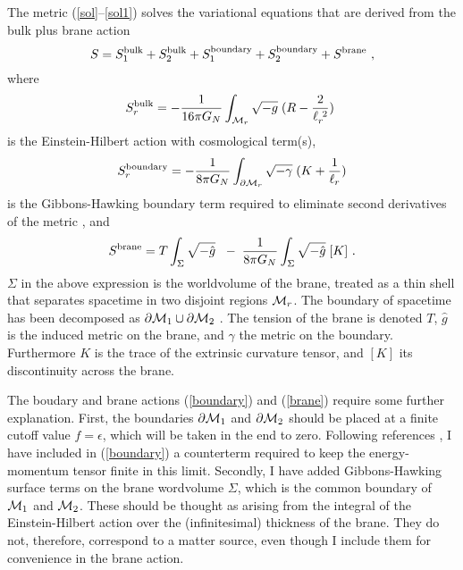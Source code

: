 \documentclass[a4paper,12pt,oneside]{article}
\begin{document}
The metric (\ref{sol}--\ref{sol1}) solves the variational equations
that are derived from
the bulk plus brane action
\begin{equation}
S = S^{\rm bulk}_1 + S^{\rm bulk}_2  + S^{\rm boundary}_1 + S^{\rm boundary}_2
+ S^{\rm brane} \ ,
\label{total}
\end{equation}
where
\begin{equation}
S^{\rm bulk}_r  = -{1\over 16\pi G_N}\int_{{\cal M}_r} \sqrt{-g}\; ( R - {2\over
\ell_r^{\ 2}})\
\label{act}
\end{equation}
is the Einstein-Hilbert action with cosmological term(s),
\begin{equation}
S^{\rm boundary}_r  = -{1\over 8\pi G_N}\int_{\partial{\cal M}_r}
\sqrt{-\gamma}\; ( K + {1\over \ell_r} )
\label{boundary}
\end{equation}
is the Gibbons-Hawking boundary term  required
to eliminate second derivatives of the metric \cite{GH},
and
\begin{equation}
S^{\rm brane} =  T\int_{\Sigma}\sqrt{-\hat g}\
\; -\; {1\over 8\pi G_N}\int_{\Sigma} \sqrt{-\hat g}\; [K]  \ .
\label{brane}
\end{equation}
\vskip 0.15cm \noindent
 $\Sigma$ in the above expression is the
worldvolume of the brane,  treated as a thin shell
that  separates spacetime in two disjoint regions
${\cal M}_r$. The boundary of spacetime has been  decomposed as
  $\partial{\cal M}_1 \cup
\partial{\cal M}_2 $ .  The tension of the brane is denoted
$T$,   $\hat g$ is the induced metric on the brane, and
$\gamma$ the metric on the boundary. Furthermore
 $K$  is the trace of the extrinsic curvature tensor,
and $[K]$ its discontinuity across the brane.


The boudary and brane actions  (\ref{boundary})
and (\ref{brane}) require  some
further  explanation. First, the boundaries
$\partial{\cal M}_1 $ and  $\partial{\cal M}_2 $ should be placed
at a  finite cutoff value  $f=\epsilon$, which will  be taken in
the end to zero.
 Following references
\cite{HSken,BK,dSS}, I  have  included in (\ref{boundary})
a counterterm  required to keep  the energy-momentum tensor finite
in this limit.
Secondly, I have
added Gibbons-Hawking surface terms on the
brane wordvolume $\Sigma$,  which is the common boundary of
${\cal M}_1 $ and  ${\cal M}_2 $.
These should be thought as  arising
from the  integral of  the Einstein-Hilbert
action over the (infinitesimal) thickness of the brane.
They do not, therefore,  correspond to a matter source,
even though  I  include
them  for convenience in  the brane action.
\end{document}
